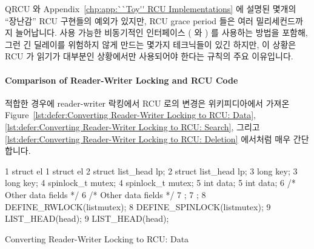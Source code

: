 QRCU 와
Appendix~\ref{chp:app:``Toy'' RCU Implementations} 에 설명된 몇개의 ``장난감''
RCU 구현들의 예외가 있지만, RCU grace period 들은 여러 밀리세컨드까지
늘어납니다.
사용 가능한 비동기적인 인터페이스 ( 와 ) 를
사용하는 방법을 포함해, 그런 긴 딜레이를 위험하지 않게 만드는 몇가지 테크닉들이
있긴 하지만, 이 상황은 RCU 가 읽기가 대부분인 상황에서만 사용되어야 한다는
규칙의 주요 이유입니다.

\paragraph{Comparison of Reader-Writer Locking and RCU Code}

적합한 경우에 reader-writer 락킹에서 RCU 로의 변경은
위키피디아에서 가져온~\cite{WikipediaRCU}
Figure~\ref{lst:defer:Converting Reader-Writer Locking to RCU: Data},
\ref{lst:defer:Converting Reader-Writer Locking to RCU: Search},
그리고
\ref{lst:defer:Converting Reader-Writer Locking to RCU: Deletion}
에서처럼 매우 간단합니다.

\begin{listing*}[htbp]
{ \scriptsize
\begin{verbbox}
 1 struct el {                           1 struct el {
 2   struct list_head lp;                2   struct list_head lp;
 3   long key;                           3   long key;
 4   spinlock_t mutex;                   4   spinlock_t mutex;
 5   int data;                           5   int data;
 6   /* Other data fields */             6   /* Other data fields */
 7 };                                    7 };
 8 DEFINE_RWLOCK(listmutex);             8 DEFINE_SPINLOCK(listmutex);
 9 LIST_HEAD(head);                      9 LIST_HEAD(head);
\end{verbbox}
}
\hspace*{0.9in}\OneColumnHSpace{-0.5in}
\theverbbox
\caption{Converting Reader-Writer Locking to RCU: Data}
\label{lst:defer:Converting Reader-Writer Locking to RCU: Data}
\end{listing*}


